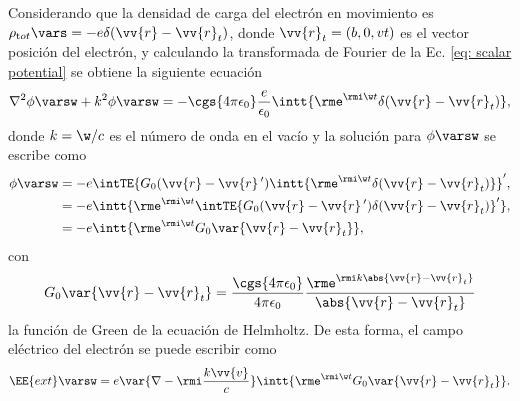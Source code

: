 Considerando que la densidad de carga del electrón en movimiento es $\rho_{\text tot}\vars = -e \delta(\vv{r}-\vv{r}_t)$, donde $\vv{r}_t = (b,0,vt)$ es el vector posición del electrón, y calculando la transformada de Fourier de la Ec. \eqref{eq: scalar potential} se obtiene la siguiente ecuación
\begin{equation}
\nabla^2\phi\varsw + k^2\phi\varsw = -\cgs{4\pi\epsilon_0}\frac{e}{\epsilon_0}\intt{\rme^{\rmi \w t} \delta(\vv{r}-\vv{r}_t)},
\end{equation}
donde $k = \w/c$ es el número de onda en el vacío y la solución para $\phi\varsw$ se escribe como \cite{maciel2019electromagnetic, de1999relativistic, barton1989elements} 
\begin{align}
\phi\varsw &= -e\intTE{G_0(\vv{r}-\vv{r}\,^{\prime})\intt{\rme^{\rmi \w t}\delta(\vv{r}-\vv{r}_t)}}^{\prime},\\
		   &= -e\intt{\rme^{\rmi \w t} \intTE{ G_0(\vv{r}-\vv{r}\,^{\prime}) \delta(\vv{r}-\vv{r}_t)}^{\prime}},\\
		   &= -e\intt{\rme^{\rmi \w t}G_0\var{\vv{r}-\vv{r}_t}},
\end{align}
con 
\begin{equation}
G_0\var{\vv{r}-\vv{r}_t} = \frac{\cgs{4\pi\epsilon_0}}{4\pi\epsilon_0}\frac{\rme^{\rmi k \abs{\vv{r}-\vv{r}_t}}}{\abs{\vv{r}-\vv{r}_t}}
\end{equation}
la función de Green de la ecuación de Helmholtz. De esta forma, el campo eléctrico del electrón se puede escribir como
\begin{equation}
\EE{ext}\varsw = e\var{\nabla-\rmi \frac{k\vv{v}}{c}} \intt{\rme^{\rmi \w t} G_0 \var{\vv{r}-\vv{r}_t}}. 
\label{eqap: electric field green apendix}
\end{equation}

